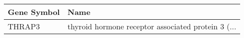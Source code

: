 \begin{tabular}{ll}
\toprule
Gene Symbol &                                               Name \\
\midrule
     THRAP3 & thyroid hormone receptor associated protein 3 (... \\
\bottomrule
\end{tabular}
